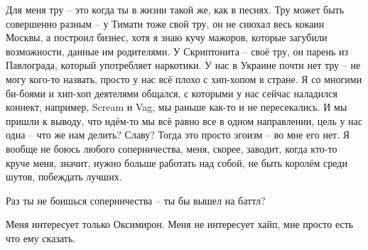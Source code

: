 Для меня тру – это когда ты в жизни такой же, как в песнях. Тру может быть
совершенно разным – у Тимати тоже свой тру, он не снюхал весь кокаин Москвы, а
построил бизнес, хотя я знаю кучу мажоров, которые загубили возможности, данные
им родителями.  У Скриптонита – своё тру, он парень из Павлограда, который
употребляет наркотики. У нас в Украине почти нет тру – не могу кого-то назвать,
просто у нас всё плохо с хип-хопом в стране. Я со многими би-боями и хип-хоп
деятелями общался, с которыми у нас сейчас наладился коннект, например, Scream
и Vag, мы раньше как-то и не пересекались. И мы пришли к выводу, что идём-то мы
всё равно все в одном направлении, цель у нас одна – что же нам делить? Славу?
Тогда это просто эгоизм – во мне его нет. Я вообще не боюсь любого
соперничества, меня, скорее, заводит, когда кто-то круче меня, значит, нужно
больше работать над собой, не быть королём среди шутов, побеждать лучших.

Раз ты не боишься соперничества – ты бы вышел на баттл?

Меня интересует только Оксимирон. Меня не интересует хайп, мне просто есть что
ему сказать. 
